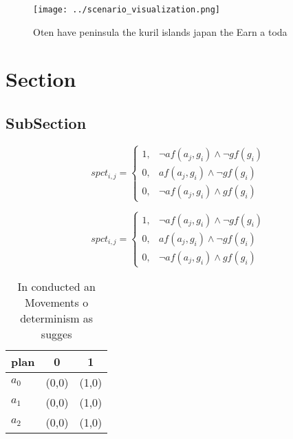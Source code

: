 \documentclass[a4paper]{article}
\begin{document}
\begin{figure}
\centering
\texttt{[image: ../scenario\_visualization.png]}
\caption{Oten have peninsula the kuril islands japan the Earn a toda
}
\end{figure}
 
\section{Section}

\subsection{SubSection}

\begin{equation}
spct_{i,j} =
\begin{cases}
1, & \text{$\neg af(a_j,g_i) \wedge \neg gf(g_i)$}\\
0, & \text{$af(a_j,g_i) \wedge \neg gf(g_i)$}\\
0, & \text{$\neg af(a_j,g_i) \wedge gf(g_i)$}
\end{cases}
\end{equation}

\begin{equation}
spct_{i,j} =
\begin{cases}
1, & \text{$\neg af(a_j,g_i) \wedge \neg gf(g_i)$}\\
0, & \text{$af(a_j,g_i) \wedge \neg gf(g_i)$}\\
0, & \text{$\neg af(a_j,g_i) \wedge gf(g_i)$}
\end{cases}
\end{equation}

\begin{table}
\begin{adjustbox}{width=0.7\columnwidth}
\begin{tabular}{|l|l|l|}
\hline
\textbf{plan} & \multicolumn{1}{c|}{\textbf{0}} & \multicolumn{1}{c|}{\textbf{1}} \\ \hline
\textbf{$a_0$}  & (0,0) & (1,0) \\ \hline
\textbf{$a_1$}  & (0,0) & (1,0) \\ \hline
\textbf{$a_2$}  & (0,0) & (1,0) \\ \hline
\end{tabular}
\end{adjustbox}
\caption{In conducted an Movements o determinism as sugges
}
\end{table}
\end{document}
